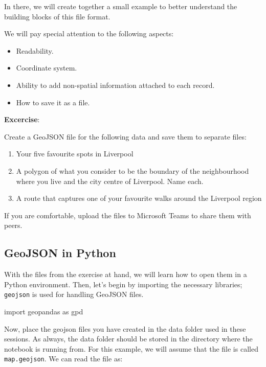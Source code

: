 \documentclass[
  letterpaper,
  DIV=11,
  numbers=noendperiod]{scrreprt}
\newenvironment{Shaded}{\begin{snugshade}}{\end{snugshade}}
\newcommand{\ImportTok}[1]{\textcolor[rgb]{0.00,0.46,0.62}{#1}}
\newcommand{\NormalTok}[1]{\textcolor[rgb]{0.00,0.23,0.31}{#1}}
\providecommand{\tightlist}{%
  \setlength{\itemsep}{0pt}\setlength{\parskip}{0pt}}\usepackage{longtable,booktabs,array}
\begin{document}
In there, we will create together a small example to better understand
the building blocks of this file format.

We will pay special attention to the following aspects:

\begin{itemize}
\tightlist
\item
  Readability.
\item
  Coordinate system.
\item
  Ability to add non-spatial information attached to each record.
\item
  How to save it as a file.
\end{itemize}

\textbf{Excercise}:

Create a GeoJSON file for the following data and save them to separate
files:

\begin{enumerate}
\def\labelenumi{\arabic{enumi}.}
\tightlist
\item
  Your five favourite spots in Liverpool
\item
  A polygon of what you consider to be the boundary of the neighbourhood
  where you live and the city centre of Liverpool. Name each.
\item
  A route that captures one of your favourite walks around the Liverpool
  region
\end{enumerate}

If you are comfortable, upload the files to Microsoft Teams to share
them with peers.

\subsection{GeoJSON in Python}\label{geojson-in-python}

With the files from the exercise at hand, we will learn how to open them
in a Python environment. Then, let's begin by importing the necessary
libraries; \texttt{geojson} is used for handling GeoJSON files.

\begin{Shaded}
\begin{Highlighting}[]
\ImportTok{import}\NormalTok{ geopandas }\ImportTok{as}\NormalTok{ gpd}
\end{Highlighting}
\end{Shaded}

Now, place the geojson files you have created in the data folder used in
these sessions. As always, the data folder should be stored in the
directory where the notebook is running from. For this example, we will
assume that the file is called \texttt{map.geojson}. We can read the
file as:
\end{document}
